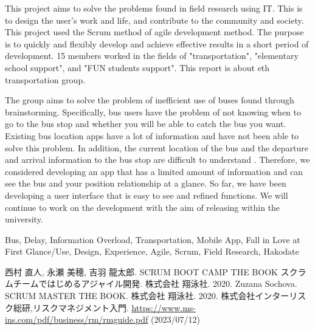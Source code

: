 \documentclass[openany,11pt,papersize,dvipdfm,draft]{jsbook}
\begin{document}
\begin{eabstract}
    This project aims to solve the problems found in field research using IT.
    This is to design the user's work and life, and contribute to the community and society.
    This project used the Scrum method of agile development method.
    The purpose is to quickly and flexibly develop and achieve effective results in a short period of development.
    15 members worked in the fields of "transportation", "elementary school support", and "FUN students support".
    This report is about eth transportation group.

    The group aims to solve the problem of inefficient use of buses found through brainstorming.
    Specifically, bus users have the problem of not knowing when to go to the bus stop and whether you will be able to catch the bus you want.
    Existing bus location apps have a lot of information and have not been able to solve this problem.
    In addition, the current location of the bus and the departure and arrival information to the bus stop are difficult to understand .
    Therefore, we considered developing an app that has a limited amount of information and can see the bus and your position relationship at a glance.
    So far, we have been developing a user interface that is easy to see and refined functions.
    We will continue to work on the development with the aim of releasing within the university.

\begin{ekeyword}
Bus, Delay, Information Overload, Transportation, Mobile App, Fall in Love at First Glance/Use, Design, Experience, Agile, Scrum, Field Research, Hakodate
\end{ekeyword}
\end{eabstract}

\tableofcontents

\mainmatter








\begin{appendix}


\end{appendix}

\begin{thebibliography}{3}
     西村 直人, 永瀬 美穂, 吉羽 龍太郎. SCRUM BOOT CAMP THE BOOK スクラムチームではじめるアジャイル開発. 株式会社 翔泳社. 2020.
     Zuzana Sochova. SCRUM MASTER THE BOOK. 株式会社 翔泳社. 2020.
     株式会社インターリスク総研,リスクマネジメント入門. \url{https://www.ms-ins.com/pdf/business/rm/rmguide.pdf} (2023/07/12)
\end{thebibliography}
\end{document}
